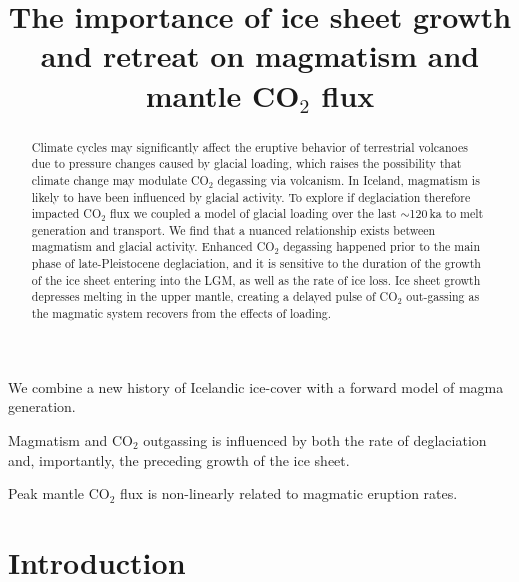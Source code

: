 \documentclass[draft,linenumbers]{agujournal2018}
\begin{document}
\title{The importance of ice sheet growth and retreat on magmatism and mantle CO$_2$ flux}





\begin{keypoints}
\item We combine a new history of Icelandic ice-cover with a forward model of magma generation.
\item Magmatism and CO$_{2}$ outgassing is influenced by both the rate of deglaciation and, importantly, the preceding growth of the ice sheet.
\item Peak mantle CO$_{2}$ flux is non-linearly related to magmatic eruption rates.
\end{keypoints}

\begin{abstract}
Climate cycles may significantly affect the eruptive behavior of terrestrial volcanoes due to pressure changes caused by glacial loading, which raises the possibility that climate change may modulate CO$_{2}$ degassing via volcanism. In Iceland, magmatism is likely to have been influenced by glacial activity. To explore if deglaciation therefore impacted CO$_{2}$ flux we coupled a model of glacial loading over the last $\sim$120\,ka to melt generation and transport. We find that a nuanced relationship exists between magmatism and glacial activity. Enhanced CO$_{2}$ degassing happened prior to the main phase of late-Pleistocene deglaciation, and it is sensitive to the duration of the growth of the ice sheet entering into the LGM, as well as the rate of ice loss. Ice sheet growth depresses melting in the upper mantle, creating a delayed pulse of CO$_{2}$ out-gassing as the magmatic system recovers from the effects of loading.
\end{abstract}

\section{Introduction}
\end{document}
